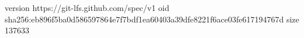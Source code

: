 version https://git-lfs.github.com/spec/v1
oid sha256:eb896f5ba0d586597864e7f7bdf1ea60403a39dfe8221f6ace03fe617194767d
size 137633
